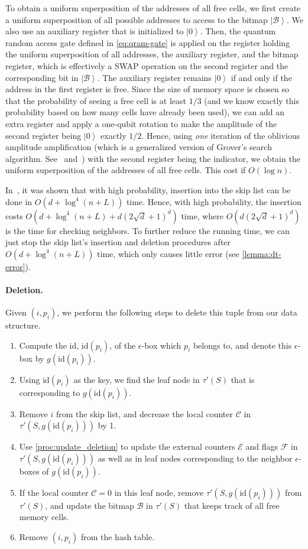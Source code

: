 \documentclass[10pt,a4paper]{article}
\newcommand{\ket}[1]{\left| #1 \right\rangle}
\newcommand{\id}{\mathrm{id}}
\begin{document}
To obtain a uniform superposition of the addresses of all free cells, we first create a uniform superposition of all possible addresses to access to the bitmap $\ket{\mathcal{B}}$. We also use an auxiliary register that is initialized to $\ket{0}$. Then, the quantum random access gate defined in \cref{eq:qram-gate} is applied on the register holding the uniform superposition of all addresses, the auxiliary register, and the bitmap register, which is effectively a SWAP operation on the second register and the corresponding bit in $\ket{\mathcal{B}}$. The auxiliary register remains $\ket{0}$ if and only if the address in the first register is free. Since the size of memory space is chosen so that the probability of seeing a free cell is at least $1/3$ (and we know exactly this probability based on how many cells have already been used), we can add an extra register and apply a one-qubit rotation to make the amplitude of the second register being $\ket{0}$ exactly $1/2$. Hence, using \emph{one} iteration of the oblivious amplitude amplification (which is a generalized version of Grover's search algorithm. See~\cite{r12} and~\cite{r34}) with the second register being the indicator, we obtain the uniform superposition of the addresses of all free cells. This cost if $O(\log n)$.

In~\cite{r5}, it was shown that with high probability, insertion into the skip list can be done in $O(d+\log^4(n+L))$ time. Hence, with high probability, the insertion costs $O(d+\log^4(n+L) + d(2\sqrt{d}+1)^d)$ time, where $O(d(2\sqrt{d}+1)^d)$ is the time for checking neighbors. 
To further reduce the running time, we can just stop the skip list's insertion and deletion procedures after $O(d+\log^4(n+L))$ time, which only causes little error (see \cref{lemma:dt-error}).


\paragraph{Deletion.}
Given $(i, p_i)$, we perform the following steps to delete this tuple from our data structure.
\begin{enumerate}
  \item Compute the id, $\id(p_i)$, of the $\epsilon$-box which $p_i$ belongs to, and denote this $\epsilon$-box by $g(\id(p_i))$.
  \item Using $\id(p_i)$ as the key, we find the leaf node in $\tau'(S)$ that is corresponding to $g(\id(p_i))$.
  \item Remove $i$ from the skip list, and decrease the local counter $\mathcal{C}$ in $\tau'(S, g(\id(p_i)))$ by 1.
  \item Use \cref{proc:update_deletion} to update the external counters $\mathcal{E}$ and flags $\mathcal{F}$ in $\tau'(S, g(\id(p_i)))$ as well as in leaf nodes corresponding to the neighbor $\epsilon$-boxes of $g(\id(p_i))$.
  \item If the local counter $\mathcal{C}=0$ in this leaf node, remove $\tau'(S, g(\id(p_i)))$ from $\tau'(S)$, and update the bitmap $\mathcal{B}$ in $\tau'(S)$ that keeps track of all free memory cells. 
  \item Remove $(i, p_i)$ from the hash table.
\end{enumerate}
\end{document}
